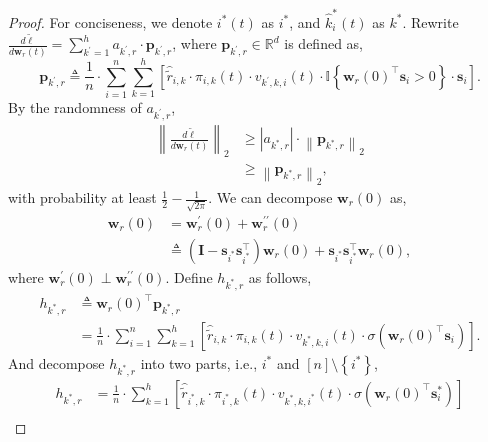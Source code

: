 \documentclass[10pt]{article}
\def\rvs{{\mathbf{s}}}
\def\rvw{{\mathbf{w}}}
\def\rvp{{\mathbf{p}}}
\def\rmI{{\mathbf{I}}}
\def\sR{{\mathbb{R}}}
\def\sI{{\mathbb{I}}}
\begin{document}
\begin{proof}
	 For conciseness, we denote $i^*(t)$ as $i^*$, and $\hat{k}_i^*(t)$ as $k^*$. Rewrite $\frac{d\tilde{\ell}}{d \rvw_r(t)} = \sum\limits_{k^
	\prime=1}^{h}{ a_{k^\prime,r} \cdot \rvp_{k^\prime, r} }$, where $\rvp_{k^\prime, r} \in \sR^d$ is defined as, 
\begin{equation*}
	\rvp_{k^\prime, r} \triangleq \frac{1}{n} \cdot \sum\limits_{i=1}^{n}{ \sum\limits_{k=1}^{h}{ \left[ \hat{\tilde{r}}_{i,k} \cdot \pi_{i,k}(t) \cdot v_{k^\prime,k,i}(t) \cdot \sI\left\{ \rvw_r(0)^\top \rvs_i > 0 \right\} \cdot \rvs_i \right] } }.
\end{equation*}
By the randomness of $a_{k^\prime,r}$,
\begin{equation}
\label{eq:gradient_p_lowerbound}
\begin{split}
	\left\| \frac{d\tilde{\ell}}{d \rvw_r(t)} \right\|_2 &\ge \left| a_{k^*,r} \right| \cdot \left\| \rvp_{k^*, r}\right\|_2 \\
	&\ge \left\| \rvp_{k^*, r}\right\|_2,
\end{split}
\end{equation}
with probability at least $\frac{1}{2} - \frac{1}{\sqrt{2\pi}}$. We can decompose $\rvw_r(0)$ as,
\begin{equation}
\label{eq:decompose_w}
\begin{split}
	\rvw_r(0) &= \rvw_r^\prime(0) + \rvw_r^{\prime\prime}(0) \\
	&\triangleq \left( \rmI - \rvs_{i^*}\rvs_{i^*}^\top \right) \rvw_r(0) +  \rvs_{i^*}\rvs_{i^*}^\top \rvw_r(0),
\end{split}
\end{equation}
where $\rvw_r^\prime(0) \perp \rvw_r^{\prime\prime}(0)$. Define $h_{k^*,r}$ as follows,
\begin{equation*}
\begin{split}
	h_{k^*,r} &\triangleq \rvw_r(0)^\top \rvp_{k^*, r} \\
	&= \frac{1}{n} \cdot \sum\limits_{i=1}^{n}{ \sum\limits_{k=1}^{h}{ \left[ \hat{\tilde{r}}_{i,k} \cdot \pi_{i,k}(t) \cdot v_{k^*,k,i}(t) \cdot \sigma( \rvw_r(0)^\top \rvs_i ) \right] } }.
\end{split}
\end{equation*}
And decompose $h_{k^*,r}$ into two parts, i.e., $i^*$ and $[n] \setminus \left\{ i^* \right\}$,
\begin{equation}
\label{eq:decompose_h}
\begin{split}
	h_{k^*,r} &= \frac{1}{n} \cdot \sum\limits_{k=1}^{h}{ \left[ \hat{\tilde{r}}_{i^*,k} \cdot \pi_{i^*,k}(t) \cdot v_{k^*,k,i^*}(t) \cdot \sigma( \rvw_r(0)^\top \rvs_i^* ) \right] } \\

\end{split}
\end{equation}
\end{proof}
\end{document}
